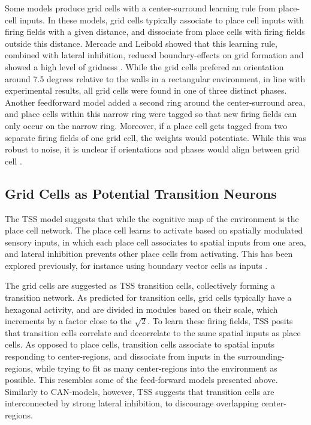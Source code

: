 \documentclass{article}
\begin{document}
    Some models produce grid cells with a center-surround learning rule from place-cell inputs. In these models, grid cells typically associate to place cell inputs with firing fields with a given distance, and dissociate from place cells with firing fields outside this distance. Mercade and Leibold showed that this learning rule, combined with lateral inhibition, reduced boundary-effects on grid formation and showed a high level of gridness \parencite{Mercado2020}. While the grid cells prefered an orientation around 7.5 degrees relative to the walls in a rectangular environment, in line with experimental results, all grid cells were found in one of three distinct phases. Another feedforward model added a second ring around the center-surround area, and place cells within this narrow ring were tagged so that new firing fields can only occur on the narrow ring. Moreover, if a place cell gets tagged from two separate firing fields of one grid cell, the weights would potentiate. While this was robust to noise, it is unclear if orientations and phases would align between grid cell \parencite{Castro2014}.

    \subsection{Grid Cells as Potential Transition Neurons} \label{Grid cell as Transition cell}
    The TSS model suggests that while the cognitive map of the environment is the place cell network. The place cell learns to activate based on spatially modulated sensory inputs, in which each place cell associates to spatial inputs from one area, and lateral inhibition prevents other place cells from activating. This has been explored previously, for instance using boundary vector cells as inputs \parencite{Barry2006}. 
   
    The grid cells are suggested as TSS transition cells, collectively forming a transition network. As predicted for transition cells, grid cells typically have a hexagonal activity, and are divided in modules based on their scale, which increments by a factor close to the \(\sqrt{2}\). 
    To learn these firing fields, TSS posits that transition cells correlate and decorrelate to the same spatial inputs as place cells. As opposed to place cells, transition cells associate to spatial inputs responding to center-regions, and dissociate from inputs in the surrounding-regions, while trying to fit as many center-regions into the environment as possible. This resembles some of the feed-forward models presented above. Similarly to CAN-models, however, TSS suggests that transition cells are interconnected by strong lateral inhibition, to discourage overlapping center-regions.
    
\end{document}
